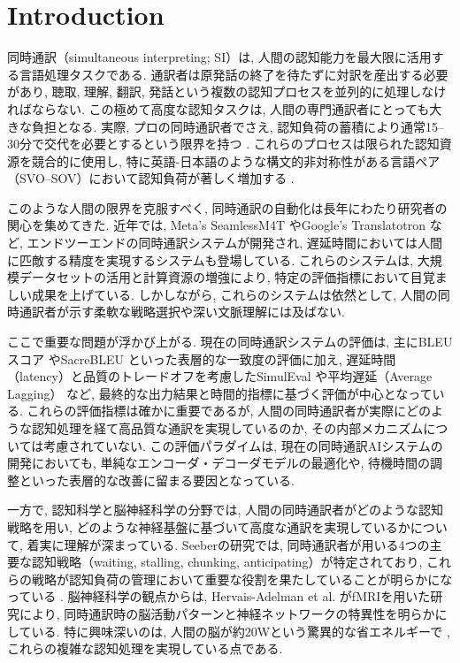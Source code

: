 \section{Introduction}

同時通訳（simultaneous interpreting; SI）は, 人間の認知能力を最大限に活用する言語処理タスクである. 
通訳者は原発話の終了を待たずに対訳を産出する必要があり, 聴取, 理解, 翻訳, 発話という複数の認知プロセスを並列的に処理しなければならない. 
この極めて高度な認知タスクは, 人間の専門通訳者にとっても大きな負担となる. 
実際, プロの同時通訳者でさえ, 認知負荷の蓄積により通常15--30分で交代を必要とするという限界を持つ \cite{gile1995regards}. 
これらのプロセスは限られた認知資源を競合的に使用し, 特に英語-日本語のような構文的非対称性がある言語ペア（SVO--SOV）において認知負荷が著しく増加する \cite{seeber2011cognitive}. 

このような人間の限界を克服すべく, 同時通訳の自動化は長年にわたり研究者の関心を集めてきた. 
近年では, Meta's SeamlessM4T \cite{barrault2023seamlessm4t} やGoogle's Translatotron \cite{jia2019direct} など, エンドツーエンドの同時通訳システムが開発され, 遅延時間においては人間に匹敵する精度を実現するシステムも登場している. 
これらのシステムは, 大規模データセットの活用と計算資源の増強により, 特定の評価指標において目覚ましい成果を上げている. 
しかしながら, これらのシステムは依然として, 人間の同時通訳者が示す柔軟な戦略選択や深い文脈理解には及ばない. 

ここで重要な問題が浮かび上がる. 
現在の同時通訳システムの評価は, 主にBLEUスコア \cite{papineni2002bleu} やSacreBLEU \cite{post2018call} といった表層的な一致度の評価に加え, 遅延時間（latency）と品質のトレードオフを考慮したSimulEval \cite{ma2020simuleval} や平均遅延（Average Lagging） \cite{ma2019stacl} など, 最終的な出力結果と時間的指標に基づく評価が中心となっている. 
これらの評価指標は確かに重要であるが, 人間の同時通訳者が実際にどのような認知処理を経て高品質な通訳を実現しているのか, その内部メカニズムについては考慮されていない. 
この評価パラダイムは, 現在の同時通訳AIシステムの開発においても, 単純なエンコーダ・デコーダモデルの最適化や, 待機時間の調整といった表層的な改善に留まる要因となっている. 

一方で, 認知科学と脳神経科学の分野では, 人間の同時通訳者がどのような認知戦略を用い, どのような神経基盤に基づいて高度な通訳を実現しているかについて, 着実に理解が深まっている. 
Seeberの研究では, 同時通訳者が用いる4つの主要な認知戦略（waiting, stalling, chunking, anticipating）が特定されており, これらの戦略が認知負荷の管理において重要な役割を果たしていることが明らかになっている \cite{seeber2011cognitive}. 
脳神経科学の観点からは, Hervais-Adelman et al. \cite{hervais2017cortical} がfMRIを用いた研究により, 同時通訳時の脳活動パターンと神経ネットワークの特異性を明らかにしている. 
特に興味深いのは, 人間の脳が約20Wという驚異的な省エネルギーで \cite{clarke2008energy}, これらの複雑な認知処理を実現している点である. 

